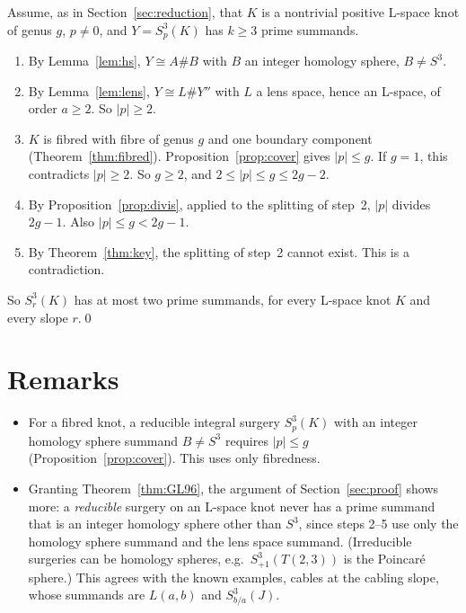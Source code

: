\documentclass[11pt]{article}
\theoremstyle{definition}
\begin{document}
Assume, as in Section~\ref{sec:reduction}, that $K$ is a nontrivial positive L-space knot of genus $g$, $p\ne0$, and $Y=S^3_p(K)$ has $k\ge3$ prime summands.
\begin{enumerate}[leftmargin=*]
\item By Lemma~\ref{lem:hs}, $Y\cong A\#B$ with $B$ an integer homology sphere, $B\ne S^3$.
\item By Lemma~\ref{lem:lens}, $Y\cong L\#Y''$ with $L$ a lens space, hence an L-space, of order $a\ge2$. So $|p|\ge2$.
\item $K$ is fibred with fibre of genus $g$ and one boundary component (Theorem~\ref{thm:fibred}). Proposition~\ref{prop:cover} gives $|p|\le g$. If $g=1$, this contradicts $|p|\ge2$. So $g\ge2$, and $2\le|p|\le g\le2g-2$.
\item By Proposition~\ref{prop:divis}, applied to the splitting of step~2, $|p|$ divides $2g-1$. Also $|p|\le g<2g-1$.
\item By Theorem~\ref{thm:key}, the splitting of step~2 cannot exist. This is a contradiction.
\end{enumerate}
So $S^3_r(K)$ has at most two prime summands, for every L-space knot $K$ and every slope $r$.\qed

\section{Remarks}

\begin{itemize}[leftmargin=*]
\item For a fibred knot, a reducible integral surgery $S^3_p(K)$ with an integer homology sphere summand $B\ne S^3$ requires $|p|\le g$ (Proposition~\ref{prop:cover}). This uses only fibredness.
\item Granting Theorem~\ref{thm:GL96}, the argument of Section~\ref{sec:proof} shows more: a \emph{reducible} surgery on an L-space knot never has a prime summand that is an integer homology sphere other than $S^3$, since steps 2--5 use only the homology sphere summand and the lens space summand. (Irreducible surgeries can be homology spheres, e.g.\ $S^3_{+1}(T(2,3))$ is the Poincar\'e sphere.) This agrees with the known examples, cables at the cabling slope, whose summands are $L(a,b)$ and $S^3_{b/a}(J)$.
\end{itemize}
\end{document}
